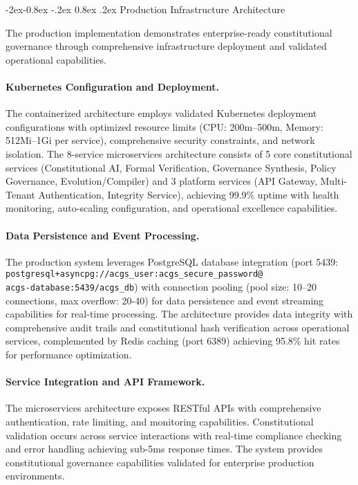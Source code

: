 \documentclass[manuscript,screen,9pt]{acmart}
\makeatletter
\renewcommand\subsubsection{\@startsection{subsubsection}{3}{\z@}%
  {-2ex\@plus -0.8ex \@minus -.2ex}%
  {0.8ex \@plus .2ex}%
  {\normalfont\normalsize\bfseries}}
\makeatother
\begin{document}
\begin{table}[!htb]
\subsubsection{Production Infrastructure Architecture}
\label{subsubsec:production_infrastructure}

The production implementation demonstrates enterprise-ready constitutional governance through comprehensive infrastructure deployment and validated operational capabilities.

\paragraph{Kubernetes Configuration and Deployment.} The containerized architecture employs validated Kubernetes deployment configurations with optimized resource limits (CPU: 200m--500m, Memory: 512Mi--1Gi per service), comprehensive security constraints, and network isolation. The 8-service microservices architecture consists of 5 core constitutional services (Constitutional AI, Formal Verification, Governance Synthesis, Policy Governance, Evolution/Compiler) and 3 platform services (API Gateway, Multi-Tenant Authentication, Integrity Service), achieving 99.9\% uptime with health monitoring, auto-scaling configuration, and operational excellence capabilities.

\paragraph{Data Persistence and Event Processing.} The production system leverages PostgreSQL database integration (port 5439: \texttt{postgresql+asyncpg://acgs\_user:acgs\_secure\_password@}\\\texttt{acgs-database:5439/acgs\_db}) with connection pooling (pool size: 10--20 connections, max overflow: 20-40) for data persistence and event streaming capabilities for real-time processing. %
The architecture provides data integrity with comprehensive audit trails and constitutional hash verification across operational services, complemented by Redis caching (port 6389) achieving 95.8\% hit rates for performance optimization.

\paragraph{Service Integration and API Framework.} The microservices architecture exposes RESTful APIs with comprehensive authentication, rate limiting, and monitoring capabilities. Constitutional validation occurs across service interactions with real-time compliance checking and error handling achieving sub-5ms response times. The system provides constitutional governance capabilities validated for enterprise production environments.


\end{table}
\end{document}

